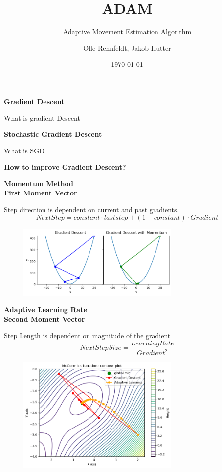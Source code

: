 \documentclass{beamer}
\author{Olle Rehnfeldt, Jakob Hutter}
\title{ADAM}
\subtitle{Adaptive Movement Estimation Algorithm}
\institute{Data Science and Society}
\date{\today}
\newcommand\myheading[1]{%
  \par\bigskip
  {\Large\bfseries#1}\par\smallskip}
\begin{document}
\begin{frame}
    \titlepage
\end{frame}


\begin{frame}
    \myheading{Gradient Descent}
    What is gradient Descent
\end{frame}


\begin{frame}
    \myheading{Stochastic Gradient Descent}
    What is SGD
\end{frame}

\begin{frame}
    \myheading{How to improve Gradient Descent?}
\end{frame}


\begin{frame}
    \myheading{Momentum Method\\First Moment Vector}
    Step direction is dependent on current and past gradients.
    $$Next Step = constant \cdot last step + (1-constant) \cdot Gradient$$
    
    \begin{figure}[h]
        \includegraphics[width=8cm]{report/figures/GD_momentum.png}
    \end{figure}
\end{frame}


\begin{frame}
    \myheading{Adaptive Learning Rate\\Second Moment Vector}
    Step Length is dependent on magnitude of the gradient
    $$NextStepSize = \frac{LearningRate}{Gradient^2} $$
    
    \begin{figure}[h]
        \includegraphics[width=8cm]{report/figures/GD_rmsprop.png}
    \end{figure}
\end{frame}
\end{document}
